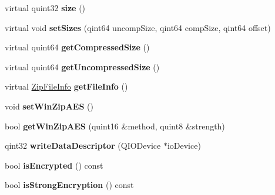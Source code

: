 \begin{DoxyCompactItemize}
\item 
virtual quint32 {\bfseries size} ()\hypertarget{class_local_file_header_a9c8046db467f4b75df105aeb9880c208}{}\label{class_local_file_header_a9c8046db467f4b75df105aeb9880c208}

\item 
virtual void {\bfseries set\+Sizes} (qint64 uncomp\+Size, qint64 comp\+Size, qint64 offset)\hypertarget{class_local_file_header_ad88a498ed8ab584b2e7f16efa8f8a4a6}{}\label{class_local_file_header_ad88a498ed8ab584b2e7f16efa8f8a4a6}

\item 
virtual quint64 {\bfseries get\+Compressed\+Size} ()\hypertarget{class_local_file_header_aedfa8ca1feeef650316300073be122aa}{}\label{class_local_file_header_aedfa8ca1feeef650316300073be122aa}

\item 
virtual quint64 {\bfseries get\+Uncompressed\+Size} ()\hypertarget{class_local_file_header_a240de2fe2662c3a34735cd82196ebb97}{}\label{class_local_file_header_a240de2fe2662c3a34735cd82196ebb97}

\item 
virtual \hyperlink{class_zip_file_info}{Zip\+File\+Info} {\bfseries get\+File\+Info} ()\hypertarget{class_local_file_header_abb9284dbe8941f0b0eadd2b150c9598e}{}\label{class_local_file_header_abb9284dbe8941f0b0eadd2b150c9598e}

\item 
void {\bfseries set\+Win\+Zip\+A\+ES} ()\hypertarget{class_local_file_header_a9500acf93c40b2af9b71c788f7a460f1}{}\label{class_local_file_header_a9500acf93c40b2af9b71c788f7a460f1}

\item 
bool {\bfseries get\+Win\+Zip\+A\+ES} (quint16 \&method, quint8 \&strength)\hypertarget{class_local_file_header_a4fa663f8a9a1b26789803dd296f3a378}{}\label{class_local_file_header_a4fa663f8a9a1b26789803dd296f3a378}

\item 
qint32 {\bfseries write\+Data\+Descriptor} (Q\+I\+O\+Device $\ast$io\+Device)\hypertarget{class_local_file_header_a0567b1c94652c562d46ee2ab4f5126a6}{}\label{class_local_file_header_a0567b1c94652c562d46ee2ab4f5126a6}

\item 
bool {\bfseries is\+Encrypted} () const \hypertarget{class_local_file_header_a33996bd1afd71db3f9f00224674b6168}{}\label{class_local_file_header_a33996bd1afd71db3f9f00224674b6168}

\item 
bool {\bfseries is\+Strong\+Encryption} () const \hypertarget{class_local_file_header_a63c1bb635cd4dcd23b0f82454c6343e4}{}\label{class_local_file_header_a63c1bb635cd4dcd23b0f82454c6343e4}


\end{DoxyCompactItemize}

